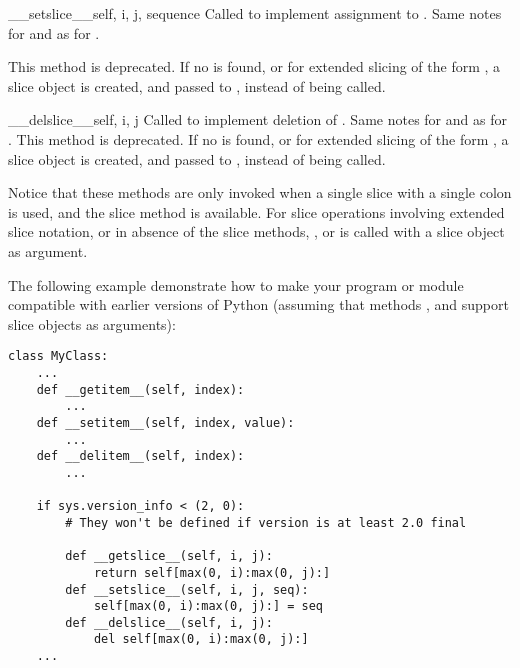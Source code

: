 \begin{methoddesc}{__setslice__}{self, i, j, sequence}
Called to implement assignment to .
Same notes for  and  as for .

This method is deprecated. If no  is found,
or for extended slicing of the form
, a
slice object is created, and passed to ,
instead of  being called.
\end{methoddesc}

\begin{methoddesc}{__delslice__}{self, i, j}
Called to implement deletion of .
Same notes for  and  as for .
This method is deprecated. If no  is found,
or for extended slicing of the form
, a
slice object is created, and passed to ,
instead of  being called.
\end{methoddesc}

Notice that these methods are only invoked when a single slice with a
single colon is used, and the slice method is available.  For slice
operations involving extended slice notation, or in absence of the
slice methods, ,  or
 is called with a slice object as argument.

The following example demonstrate how to make your program or module
compatible with earlier versions of Python (assuming that methods
,  and 
support slice objects as arguments):

\begin{verbatim}
class MyClass:
    ...
    def __getitem__(self, index):
        ...
    def __setitem__(self, index, value):
        ...
    def __delitem__(self, index):
        ...

    if sys.version_info < (2, 0):
        # They won't be defined if version is at least 2.0 final

        def __getslice__(self, i, j):
            return self[max(0, i):max(0, j):]
        def __setslice__(self, i, j, seq):
            self[max(0, i):max(0, j):] = seq
        def __delslice__(self, i, j):
            del self[max(0, i):max(0, j):]
    ...
\end{verbatim}

